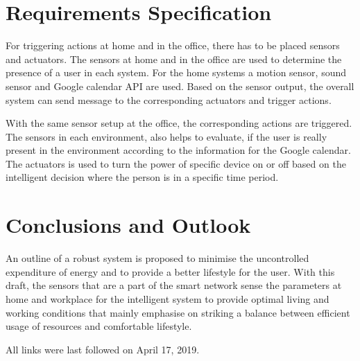 \documentclass[runningheads]{llncs}
\begin{document}
\section{Requirements Specification}

For triggering actions at home and in the office, there has to be placed sensors and actuators.
The sensors at home and in the office are used to determine the presence of a user in each system. 
For the home systems a motion sensor, sound sensor and Google calendar API are used.
Based on the sensor output, the overall system can send message to the corresponding actuators and trigger actions. 

With the same sensor setup at the office, the corresponding actions are triggered. 
The sensors in each environment, also helps to evaluate, if the user is really present in the environment according to the information for the Google calendar. 
The actuators is used to turn  the power of specific device on or off based on the intelligent decision where the person is in a specific time period.

\section{Conclusions and Outlook}
An outline of a robust system is proposed to minimise the uncontrolled expenditure of energy and to provide a better lifestyle for the user. With this draft, the sensors that are a part of the smart network sense the parameters at home and workplace for the intelligent system to provide optimal living and working conditions that mainly emphasise on striking a balance between efficient usage of resources and comfortable lifestyle.

%
%



All links were last followed on April 17, 2019.
\end{document}
